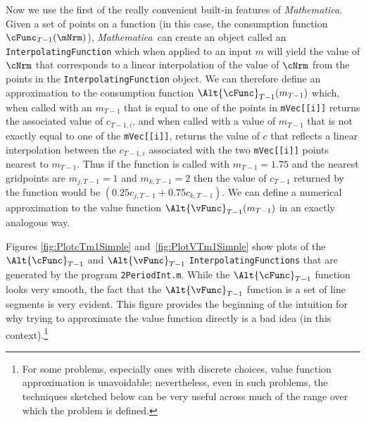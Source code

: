 \documentclass[titlepage, headings=optiontotocandhead]{\econtex}
\newcommand{\Mma}{\textit{Mathematica}}
\begin{document}
Now we use the first of the really convenient built-in features of
 {\Mma}.
Given a set of points on a function (in this case, the consumption
function $\cFunc_{T-1}(\mNrm)$), {\Mma}~can create an object
called an \texttt{InterpolatingFunction} which when applied to an
input ${m}$ will yield the value of $\cNrm$ that corresponds to a
linear interpolation of the value of $\cNrm$ from the points in the
\texttt{InterpolatingFunction} object.  We can therefore define an 
approximation to the consumption function $\Alt{\cFunc}_{T-1}({m}_{T-1})$ which, when called with an
${m}_{T-1}$ that is equal to one of the points in
\texttt{mVec[[i]]} returns the associated value of
${c}_{T-1,i}$, and when called with a value of ${m}_{T-1}$ that
is not exactly equal to one of the \texttt{mVec[[i]]}, returns
the value of ${c}$ that reflects a linear interpolation between the
${c}_{T-1,i}$ associated with the two \texttt{mVec[[i]]}
points nearest to ${m}_{T-1}$.  Thus if the function is called with
${m}_{T-1} = 1.75$ and the nearest gridpoints
 are ${m}_{j,T-1}=1$ and
${m}_{k,T-1}=2$ then the value of ${c}_{T-1}$ returned by the
function would be $(0.25 {c}_{j,T-1}+0.75 {c}_{k,T-1})$. We
can define a numerical approximation to the value function
$\Alt{\vFunc}_{T-1}({m}_{T-1})$ in an exactly analogous way.


Figures \ref{fig:PlotcTm1Simple} and~\ref{fig:PlotVTm1Simple} show
plots of the $\Alt{\cFunc}_{T-1}$ and $\Alt{\vFunc}_{T-1}$
\texttt{InterpolatingFunctions} that are generated by the program
\texttt{2PeriodInt.m}.  While the $\Alt{\cFunc}_{T-1}$ function looks
very smooth, the fact that the $\Alt{\vFunc}_{T-1}$ function is a set
of line segments is very evident.  This figure provides the beginning
of the intuition for why trying to approximate the value function
directly is a bad idea (in this context).\footnote{For some problems,
  especially ones with discrete choices, value function approximation is unavoidable;
  nevertheless, even in such problems, the techniques sketched below can
  be very useful across much of the range over which the problem is defined.}
\end{document}
